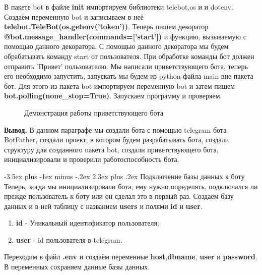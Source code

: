 \documentclass[12pt, oldlfont, amsfonts]{report}
\makeatletter
\renewcommand{\section}{\@startsection{section}{1}{0pt}%
                                {-3.5ex plus -1ex minus -.2ex}%
                                {2.3ex plus .2ex}%
{\centering\hyphenpenalty=10000\normalfont\Large\bfseries}}
\makeatother
\begin{document}
В пакете bot в файле {\bf init} импортируем библиотеки telebot,os и и dotenv. Создаём переменную bot и записываем в неё {\bf telebot.TeleBot(os.getenv('token'))}. Теперь пишем декоратор {\bf @bot.message\_handler(commands=['start'])} и функцию, вызываемую с помощью данного декоратора. С помощью данного декоратора мы будем обрабатывать команду start от пользователя. При обработке команды бот должен отправить 'Привет' пользователю. Мы написали приветствующего бота, теперь его необходимо запустить, запускать мы будем из python файла main вне пакета бот. Для этого из пакета bot импортируем переменную bot и затем пишем {\bf bot.polling(none\_stop=True)}. Запускаем программу и проверяем.


\begin{figure}[h!]
\caption{Демонстрация работы приветствующего бота}
\label{fig:1.jpeg}
\end{figure}

{\bf Вывод.} В данном параграфе мы создали бота с помощью telegram бота BotFather, создали проект, в котором будем разрабатывать бота, создали структуру для созданного пакета bot, создали приветствующего бота, инициализировали и проверили работоспособность бота.
 
\section{Подключение базы данных к боту}
Теперь, когда мы инициализировали бота, ему нужно определять, подключался ли прежде пользователь к боту или он сделал это в первый раз. Создаём базу данных и в ней таблицу с названием {\bf users} и полями {\bf id} и {\bf user}.

\begin{enumerate}
\item {\bf id} - Уникальный идентификатор пользователя;
\item {\bf user} - id пользователя в telegram.
\end{enumerate}	
Переходим в файл {\bf .env} и создаём переменные {\bf host},{\bf dbname}, {\bf user} и {\bf password}. В переменных сохраняем данные базы данных.
\end{document}
